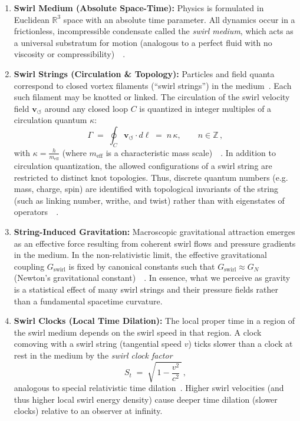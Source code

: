 \documentclass[aps,onecolumn,10pt,nofootinbib]{revtex4}
\newcommand{\swirlarrow}{\circlearrowleft} %
\newcommand{\vswirl}{\mathbf{v}_{\!\swirlarrow}}     %
\begin{document}
	\begin{enumerate}\itemsep 4pt
	\item \textbf{Swirl Medium (Absolute Space-Time):} Physics is formulated in Euclidean $\mathbb{R}^3$ space with an absolute time parameter. All dynamics occur in a frictionless, incompressible condensate called the \emph{swirl medium}, which acts as a universal substratum for motion (analogous to a perfect fluid with no viscosity or compressibility)~\cite{index14}~\cite{index15}.
	\item \textbf{Swirl Strings (Circulation \& Topology):} Particles and field quanta correspond to closed vortex filaments (“swirl strings”) in the medium~\cite{index16}. Each such filament may be knotted or linked. The circulation of the swirl velocity field $\vswirl$ around any closed loop $C$ is quantized in integer multiples of a circulation quantum $\kappa$:
	\[
		\Gamma \;=\; \oint_{C} \vswirl \cdot d\ell \;=\; n\,\kappa, \qquad n\in \mathbb{Z}\,,
	\]
	with $\displaystyle \kappa = \frac{h}{m_{\mathrm{eff}}}$ (where $m_{\mathrm{eff}}$ is a characteristic mass scale)~\cite{index17}~\cite{index18}. In addition to circulation quantization, the allowed configurations of a swirl string are restricted to distinct knot topologies. Thus, discrete quantum numbers (e.g. mass, charge, spin) are identified with topological invariants of the string (such as linking number, writhe, and twist) rather than with eigenstates of operators~\cite{index19}~\cite{index20}.
	\item \textbf{String-Induced Gravitation:} Macroscopic gravitational attraction emerges as an effective force resulting from coherent swirl flows and pressure gradients in the medium. In the non-relativistic limit, the effective gravitational coupling $G_{\text{swirl}}$ is fixed by canonical constants such that $G_{\text{swirl}} \approx G_N$ (Newton’s gravitational constant)~\cite{index21}~\cite{index22}. In essence, what we perceive as gravity is a statistical effect of many swirl strings and their pressure fields rather than a fundamental spacetime curvature.
	\item \textbf{Swirl Clocks (Local Time Dilation):} The local proper time in a region of the swirl medium depends on the swirl speed in that region. A clock comoving with a swirl string (tangential speed $v$) ticks slower than a clock at rest in the medium by the \emph{swirl clock factor}
	\[
		S_t \;=\; \sqrt{\,1 - \frac{v^2}{c^2}\,}\,,
	\]
	analogous to special relativistic time dilation~\cite{index23}. Higher swirl velocities (and thus higher local swirl energy density) cause deeper time dilation (slower clocks) relative to an observer at infinity.

\end{enumerate}
\end{document}
